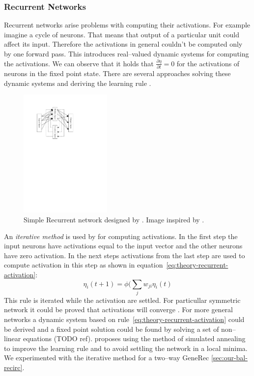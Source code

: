 \subsubsection{Recurrent Networks}
\label{sec:theory-recurrent} 

Recurrent networks arise problems with computing their activations. For example imagine a cycle of neurons. That means that output of a particular unit could affect its input. Therefore the activations in general couldn't be computed only by one forward pass. This introduces real--valued dynamic systems for computing the activations. We can observe that it holds that $\frac{\partial\eta}{\partial t} = 0$ for the activations of neurons in the fixed point state. There are several approaches solving these dynamic systems and deriving the learning rule \cite{pineda1987generalization, pearlmutter1989learning, williams1989learning, elman1990finding, haykin1994neural}. 

\begin{figure}[H]
  \centering
  \includegraphics[width=0.4\textwidth]{img/models-recurrent.pdf}    
  \caption{Simple Recurrent network designed by \citet{elman1990finding}. Image inspired by \citep{haykin1994neural}.} 
  \label{fig:theory-recurrent}
\end{figure}

An \emph{iterative method} is used by \citet{movellan1990contrastive} for computing activations. In the first step the input neurons have activations equal to the input vector and the other neurons have zero activation. In the next steps activations from the last step are used to compute activation in this step as shown in equation~\ref{eq:theory-recurrent-activation}: 
\begin{equation}
  \label{eq:theory-recurrent-activation} 
  \eta_i(t+1) = \phi(\sum_j w_{ji}\eta_i(t)
\end{equation}
This rule is iterated while the activation are settled. For particullar symmetric network it could be proved that activations will converge \citep{o1996bio}. For more general networks a dynamic system based on rule~\ref{eq:theory-recurrent-activation} could be derived and a fixed point solution could be found by solving a set of non--linear equations (TODO ref). \citet{movellan1990contrastive} proposes using the method of simulated annealing \citep{kirkpatrick1983optimization,vcerny1985thermodynamical} to improve the learning rule and to avoid settling the network in a local minima. We experimented with the iterative method for a two--way GeneRec \ref{sec:our-bal-recirc}. 

